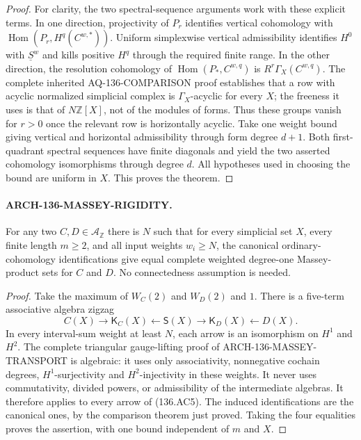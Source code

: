\begin{proof}
For clarity, the two spectral-sequence arguments work
with these explicit terms. In one direction,
projectivity of $P_r$ identifies vertical cohomology
with $\operatorname{Hom}(P_r,H^q(C^{w,*}))$. Uniform
simplexwise vertical admissibility identifies $H^0$
with $\underline S^w$ and kills positive $H^q$ through
the required finite range. In the other direction,
the resolution cohomology of
$\operatorname{Hom}(P_*,C^{w,q})$ is
$R^r\Gamma_X(C^{w,q})$. The complete inherited
AQ-136-COMPARISON proof establishes that a row with
acyclic normalized simplicial complex is
$\Gamma_X$-acyclic for every $X$; the freeness it uses
is that of $N\mathbb Z[X]$, not of the modules of forms.
Thus these groups vanish for $r>0$ once the relevant
row is horizontally acyclic. Take one weight bound
giving vertical and horizontal admissibility through
form degree $d+1$. Both first-quadrant spectral
sequences have finite diagonals and yield the two
asserted cohomology isomorphisms through degree $d$.
All hypotheses used in choosing the bound are uniform
in $X$. This proves the theorem.
\end{proof}

\paragraph{ARCH-136-MASSEY-RIGIDITY.}
For any two $C,D\in\mathcal A_{\mathbb Z}$ there is $N$
such that for every simplicial set $X$, every finite
length $m\geq2$, and all input weights $w_i\geq N$,
the canonical ordinary-cohomology identifications give
equal complete weighted degree-one Massey-product sets
for $C$ and $D$. No connectedness assumption is needed.

\begin{proof}
Take the maximum of $W_C(2)$ and $W_D(2)$ and $1$.
There is a five-term associative algebra zigzag
\[
 C(X)\longrightarrow\mathsf K_C(X)
 \longleftarrow\mathsf S(X)
 \longrightarrow\mathsf K_D(X)\longleftarrow D(X).
                                                               \tag{136.AC5}
\]
In every interval-sum weight at least $N$, each arrow
is an isomorphism on $H^1$ and $H^2$. The complete
triangular gauge-lifting proof of
ARCH-136-MASSEY-TRANSPORT is algebraic: it uses only
associativity, nonnegative cochain degrees,
$H^1$-surjectivity and $H^2$-injectivity in these
weights. It never uses commutativity, divided powers,
or admissibility of the intermediate algebras.
It therefore applies to every arrow of (136.AC5).
The induced identifications are the canonical ones,
by the comparison theorem just proved. Taking the
four equalities proves the assertion, with one bound
independent of $m$ and $X$.
\end{proof}

